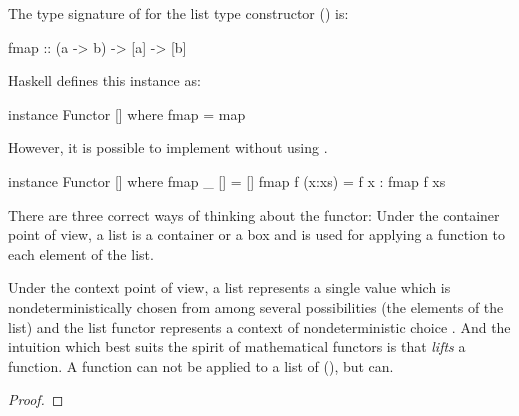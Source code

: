 \begin{example}
  \label{ex:functor-list-haskell}

  The type signature of  for the list type constructor
  (\texthaskell{[]}) is:
  \begin{codehaskell}
fmap :: (a -> b) -> [a] -> [b]
  \end{codehaskell}

  Haskell defines this instance as:
  \begin{codehaskell}
instance Functor [] where
  fmap = map
  \end{codehaskell}
  However, it is possible to implement  without using
  .
  \begin{codehaskell}
instance Functor [] where
  fmap _ []     = []
  fmap f (x:xs) = f x : fmap f xs
  \end{codehaskell}


  There are three correct ways of thinking about the \texthaskell{[]}
  functor: Under the container point of view, a list is a container or
  a box and  is used for applying a function to each
  element of the list.

  Under the context point of view, a list represents a single value
  which is nondeterministically chosen from among several
  possibilities (the elements of the list) and the list functor
  represents a context of nondeterministic choice
  \parencite{yorgey-2009}. And the intuition which best suits the
  spirit of mathematical functors is that  \emph{lifts} a
  function. A function  can not be applied to a
  list of  (\texthaskell{[a]}), but 
  can.

  \begin{proof}


\end{proof}
\end{example}
